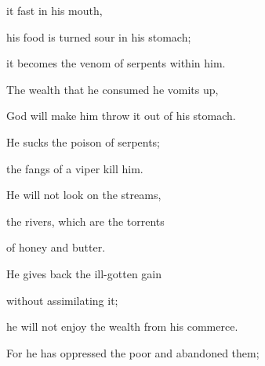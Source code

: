 {it fast
in
his mouth,
\par }{\Q {}his food
is turned
sour
in his stomach;
\par }{\Q it becomes the venom of serpents
within him.
\par }{\Q {}The wealth
that he consumed he vomits
up,
\par }{\Q God
will make him throw it out of his stomach.
\par }{\Q {}He sucks the poison
of serpents;
\par }{\Q the fangs
of a viper
kill him.
\par }{\Q {}He will not
look
on the streams,
\par }{\Q the rivers,
which are the torrents
\par }{\Q of honey
and butter.
\par }{\Q {}He gives back
the ill-gotten gain
\par }{\Q without
assimilating
it;

\par }{\Q he will not
enjoy
the wealth from his commerce.
\par }{\Q {}For
he has oppressed
the poor
and abandoned
them;

}
